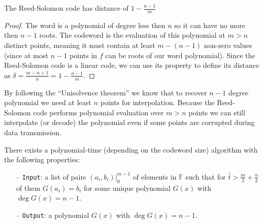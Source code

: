\documentclass[../lecture-notes.tex]{subfiles}
\begin{document}
\begin{lemma}
The Reed-Solomon code has distance of $1 - \frac{n-1}{m}$
\end{lemma}
\begin{proof}
The word is a polynomial of degree less then $n$ so it can have no more then $n-1$ roots. The codeword is the 
evaluation of this polynomial at $m > n$ distinct points, meaning it must contain at least $m-(n-1)$ non-zero 
values (since at most $n-1$ points in $f$ can be roots of our word polynomial). Since the Reed-Solomon code is a 
linear code, we can use its property to define its distance as $\delta =\frac{m - n + 1}{n} = 1 - \frac{n-1}{m}$.
\end{proof}

By following the ``Unisolvence theorem'' we know that to recover $n-1$ degree polynomial we need at least $n$ points 
for interpolation. Because the Reed-Solomon code performs polynomial evaluation over $m > n$ points we can still 
interpolate (or decode) the polynomial even if some points are corrupted during data transmission.


\begin{theorem}
There exists a polynomial-time (depending on the codeword size) algorithm with the following properties:
\begin{itemize}
    \item[--] \verb|Input|: a list of pairs $(a_i, b_i)|^{m-1}_0$ of elements in $\mathbb{F}$ such that for 
    $\hat{t} > \frac{m}{2} + \frac{n}{2}$ of them $G(a_i) = b_i$ for some unique polynomial $G(x)$ with $\deg G(x) = n-1$.
    \item[--] \verb|Output|: a polynomial $G(x)$ with $\deg G(x) = n-1$. 
\end{itemize}
\end{theorem}
\end{document}
